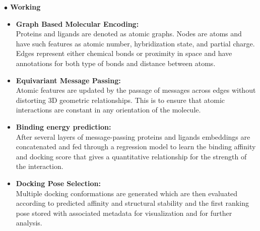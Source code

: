 \documentclass[12pt,a4]{report}
\begin{document}
\vspace{0.3cm}
\noindent\textbf{\large $\bullet$ Working}
\begin{itemize}
    \renewcommand\labelitemi{--}
    \item \textbf{Graph Based Molecular Encoding:}\\
    \hspace{0.3in}
    Proteins and ligands are denoted as atomic graphs. Nodes are atoms and have such features as atomic number, hybridization state, and partial charge. Edges represent either chemical bonds or proximity in space and have annotations for both type of bonds and distance between atoms.

    \item \textbf{Equivariant Message Passing:}\\
    \hspace{0.3in}
    Atomic features are updated by the passage of messages across edges without distorting 3D geometric relationships. This is to ensure that atomic interactions are constant in any orientation of the molecule.

    \item \textbf{Binding energy prediction: }\\
    \hspace{0.3in}
    After several layers of message-passing proteins and ligands embeddings are concatenated and fed through a regression model to learn the binding affinity and docking score that gives a quantitative relationship for the strength of the interaction.

    \item \textbf{Docking Pose Selection:}\\
    \hspace{0.3in}
    Multiple docking conformations are generated which are then evaluated according to predicted affinity and structural stability and the first ranking pose stored with associated metadata for visualization and for further analysis.
\end{itemize}
\end{document}
